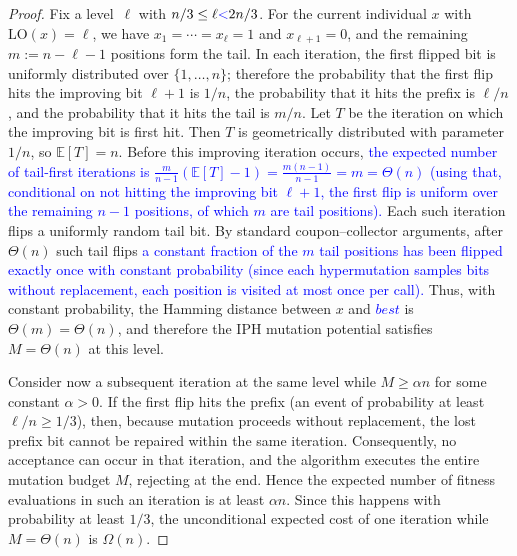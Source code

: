 \begin{proof}

Fix a level~$\ell$ with $n/3\le \ell \textcolor{blue}{<} 2n/3$. For the current individual $x$ with $\mathrm{LO}(x)=\ell$, we have $x_1=\cdots=x_{\ell}=1$ and $x_{\ell+1}=0$, and the remaining $m:=n-\ell-1$ positions form the tail. In each iteration, the first flipped bit is uniformly distributed over $\{1,\dots,n\}$; therefore the probability that the first flip hits the improving bit $\ell+1$ is $1/n$, the probability that it hits the prefix is $\ell/n$, and the probability that it hits the tail is $m/n$. Let $T$ be the iteration on which the improving bit is first hit. Then $T$ is geometrically distributed with parameter~$1/n$, so $\mathbb{E}[T]=n$. Before this improving iteration occurs, %
\textcolor{blue}{the expected number of tail-first iterations is
$\frac{m}{n-1}(\mathbb{E}[T]-1) = \frac{m(n-1)}{n-1} = m = \Theta(n)$
(using that, conditional on not hitting the improving bit $\ell+1$, the
first flip is uniform over the remaining $n-1$ positions, of which $m$
are tail positions).} Each such iteration flips a uniformly random tail bit. By standard coupon--collector arguments, after $\Theta(n)$ such tail flips %
\textcolor{blue}{a constant fraction of the $m$ tail positions has been flipped exactly once
with constant probability (since each hypermutation samples bits without
replacement, each position is visited at most once per call).} %
Thus, with constant probability, the Hamming distance between $x$ and \textcolor{blue}{$\mathit{best}$} is $\Theta(m)=\Theta(n)$, and therefore the IPH mutation potential satisfies $M=\Theta(n)$ at this level.

Consider now a subsequent iteration at the same level while $M\ge \alpha n$ for some constant $\alpha>0$. If the first flip hits the prefix (an event of probability at least $\ell/n\ge 1/3$), then, because mutation proceeds without replacement, the lost prefix bit cannot be repaired within the same iteration. Consequently, no acceptance can occur in that iteration, and the algorithm executes the entire mutation budget $M$, rejecting at the end. Hence the expected number of fitness evaluations in such an iteration is at least $\alpha n$. Since this happens with probability at least $1/3$, the unconditional expected cost of one iteration while $M=\Theta(n)$ is $\Omega(n)$.


\end{proof}
